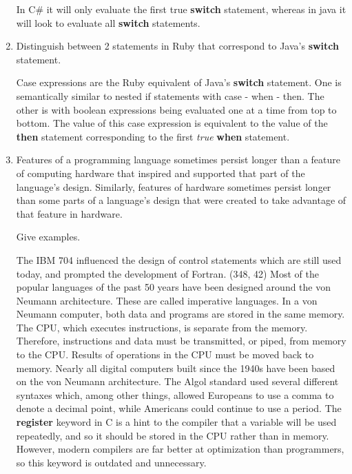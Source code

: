 \begin{enumerate}
\begin{answer}
    In C\# it will only evaluate the first true \textbf{switch} statement, whereas in java it will look to evaluate all \textbf{switch} statements.  

    \end{answer}

  \item Distinguish between 2 statements in Ruby
    that correspond to Java's \textbf{switch} statement.

    \begin{answer}

    Case expressions are the Ruby equivalent of Java's \textbf{switch} statement. One is semantically similar to nested if statements with case - when - then. The other is with boolean expressions being evaluated one at a time from top to bottom. The value of this case expression is equivalent to the value of the \textbf{then} statement corresponding to the first \textit{true} \textbf{when} statement.
    
    \end{answer}

  \item Features of a programming language sometimes persist
    longer than a feature of computing hardware that inspired
    and supported that part of the language's design.
    Similarly, features of hardware sometimes persist longer
    than some parts of a language's design that were created
    to take advantage of that feature in hardware.

    Give examples.

    \begin{answer}
    The IBM 704 influenced the design of control statements which are still used today, and prompted the development of Fortran. (348, 42)
    Most of the popular languages of the past 50 years have been designed around the von Neumann architecture. These are called imperative languages. In a von Neumann computer, both data and programs are stored in the same memory. The CPU, which executes instructions, is separate from the memory. Therefore, instructions and data must be transmitted, or piped, from memory to the CPU. Results of operations in the CPU must be moved back to memory. Nearly all digital computers built since the 1940s have been based on the von Neumann architecture.
    The Algol standard used several different syntaxes which, among other things, allowed Europeans to use a comma to denote a decimal point, while Americans could continue to use a period.
    The \textbf{register} keyword in C is a hint to the compiler that a variable will be used repeatedly, and so it should be stored in the CPU rather than in memory. However, modern compilers are far better at optimization than programmers, so this keyword is outdated and unnecessary.


\end{answer}
\end{enumerate}
